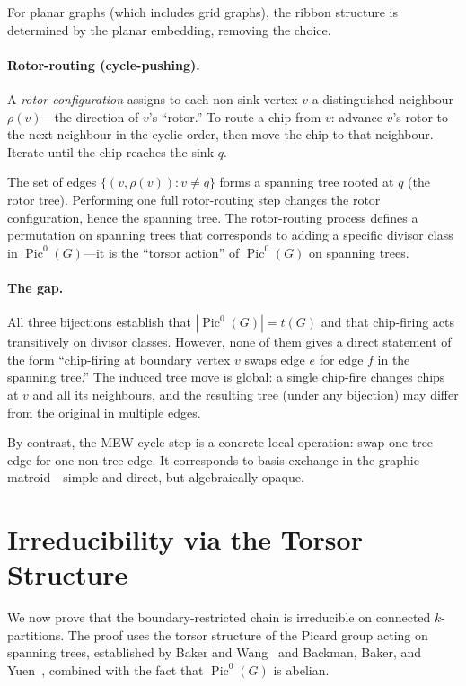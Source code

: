 \documentclass[11pt]{article}
\newcommand{\Pic}{\operatorname{Pic}^0}
\begin{document}
For planar graphs (which includes grid graphs), the ribbon structure is
determined by the planar embedding, removing the choice.

\paragraph{Rotor-routing (cycle-pushing).}
A \emph{rotor configuration} assigns to each non-sink vertex $v$ a distinguished
neighbour $\rho(v)$---the direction of $v$'s ``rotor.'' To route a chip from
$v$: advance $v$'s rotor to the next neighbour in the cyclic order, then move
the chip to that neighbour. Iterate until the chip reaches the sink $q$.

The set of edges $\{(v, \rho(v)) : v \neq q\}$ forms a spanning tree rooted at
$q$ (the rotor tree). Performing one full rotor-routing step changes the rotor
configuration, hence the spanning tree. The rotor-routing process defines a
permutation on spanning trees that corresponds to adding a specific divisor
class in $\Pic(G)$---it is the ``torsor action'' of $\Pic(G)$ on spanning
trees.

\paragraph{The gap.}
All three bijections establish that $|\Pic(G)| = t(G)$ and that chip-firing
acts transitively on divisor classes. However, none of them gives a direct
statement of the form ``chip-firing at boundary vertex $v$ swaps edge $e$ for
edge $f$ in the spanning tree.'' The induced tree move is global: a single
chip-fire changes chips at $v$ and all its neighbours, and the resulting tree
(under any bijection) may differ from the original in multiple edges.

By contrast, the MEW cycle step is a concrete local operation: swap one tree
edge for one non-tree edge. It corresponds to basis exchange in the graphic
matroid---simple and direct, but algebraically opaque.


\section{Irreducibility via the Torsor Structure}\label{sec:irreducibility-proof}

We now prove that the boundary-restricted chain is irreducible on connected
$k$-partitions. The proof uses the torsor structure of the Picard group acting
on spanning trees, established by Baker and
Wang~\cite{baker2018bernardi} and Backman, Baker, and
Yuen~\cite{backman2019geometric}, combined with the fact that
$\Pic(G)$ is abelian.
\end{document}
